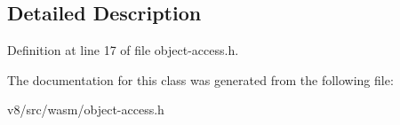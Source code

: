 \subsection{Detailed Description}


Definition at line 17 of file object-\/access.\+h.



The documentation for this class was generated from the following file\+:\begin{DoxyCompactItemize}
\item 
v8/src/wasm/object-\/access.\+h\end{DoxyCompactItemize}
